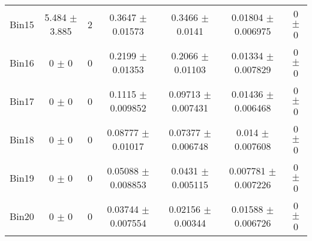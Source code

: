\begin{tabular}{@{\extracolsep{4pt}}lcccccc@{}}
     Bin15 & 5.484 $\pm$ 3.885 & 2 & 0.3647 $\pm$ 0.01573 & 0.3466 $\pm$ 0.0141 & 0.01804 $\pm$ 0.006975 & 0 $\pm$ 0 \\ 
     Bin16 & 0 $\pm$ 0 & 0 & 0.2199 $\pm$ 0.01353 & 0.2066 $\pm$ 0.01103 & 0.01334 $\pm$ 0.007829 & 0 $\pm$ 0 \\ 
     Bin17 & 0 $\pm$ 0 & 0 & 0.1115 $\pm$ 0.009852 & 0.09713 $\pm$ 0.007431 & 0.01436 $\pm$ 0.006468 & 0 $\pm$ 0 \\ 
     Bin18 & 0 $\pm$ 0 & 0 & 0.08777 $\pm$ 0.01017 & 0.07377 $\pm$ 0.006748 & 0.014 $\pm$ 0.007608 & 0 $\pm$ 0 \\ 
     Bin19 & 0 $\pm$ 0 & 0 & 0.05088 $\pm$ 0.008853 & 0.0431 $\pm$ 0.005115 & 0.007781 $\pm$ 0.007226 & 0 $\pm$ 0 \\ 
     Bin20 & 0 $\pm$ 0 & 0 & 0.03744 $\pm$ 0.007554 & 0.02156 $\pm$ 0.00344 & 0.01588 $\pm$ 0.006726 & 0 $\pm$ 0 \\ 
\hline\hline
  \end{tabular}

